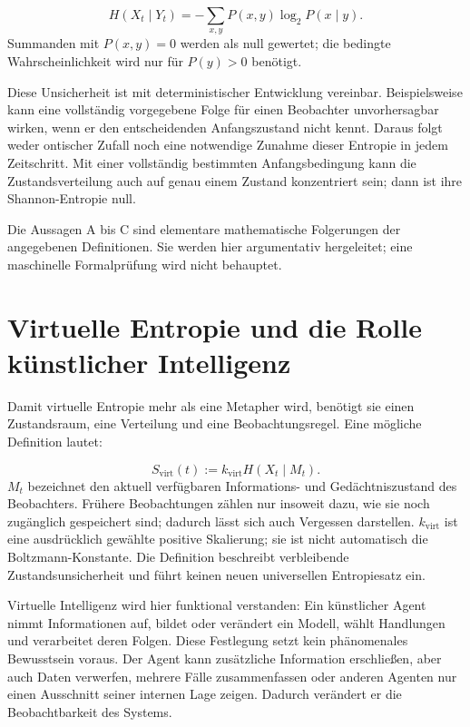 \begin{equation}\label{de:eq3}
H(X_t\mid Y_t)=-\sum_{x,y}P(x,y)\log_2 P(x\mid y).
\end{equation}
Summanden mit \(P(x,y)=0\) werden als null gewertet; die bedingte Wahrscheinlichkeit wird nur für \(P(y)>0\) benötigt.

Diese Unsicherheit ist mit deterministischer Entwicklung vereinbar. Beispielsweise kann eine vollständig vorgegebene Folge für einen Beobachter unvorhersagbar wirken, wenn er den entscheidenden Anfangszustand nicht kennt. Daraus folgt weder ontischer Zufall noch eine notwendige Zunahme dieser Entropie in jedem Zeitschritt. Mit einer vollständig bestimmten Anfangsbedingung kann die Zustandsverteilung auch auf genau einem Zustand konzentriert sein; dann ist ihre Shannon-Entropie null.

Die Aussagen A bis C sind elementare mathematische Folgerungen der angegebenen Definitionen. Sie werden hier argumentativ hergeleitet; eine maschinelle Formalprüfung wird nicht behauptet.

\section{Virtuelle Entropie und die Rolle künstlicher Intelligenz}\label{de:sec4}
Damit virtuelle Entropie mehr als eine Metapher wird, benötigt sie einen Zustandsraum, eine Verteilung und eine Beobachtungsregel. Eine mögliche Definition lautet:

\begin{equation}\label{de:eq4}
S_{\mathrm{virt}}(t):=k_{\mathrm{virt}}H(X_t\mid M_t).
\end{equation}
\(M_t\) bezeichnet den aktuell verfügbaren Informations- und Gedächtniszustand des Beobachters. Frühere Beobachtungen zählen nur insoweit dazu, wie sie noch zugänglich gespeichert sind; dadurch lässt sich auch Vergessen darstellen. \(k_{\mathrm{virt}}\) ist eine ausdrücklich gewählte positive Skalierung; sie ist nicht automatisch die Boltzmann-Konstante. Die Definition beschreibt verbleibende Zustandsunsicherheit und führt keinen neuen universellen Entropiesatz ein.

Virtuelle Intelligenz wird hier funktional verstanden: Ein künstlicher Agent nimmt Informationen auf, bildet oder verändert ein Modell, wählt Handlungen und verarbeitet deren Folgen. Diese Festlegung setzt kein phänomenales Bewusstsein voraus. Der Agent kann zusätzliche Information erschließen, aber auch Daten verwerfen, mehrere Fälle zusammenfassen oder anderen Agenten nur einen Ausschnitt seiner internen Lage zeigen. Dadurch verändert er die Beobachtbarkeit des Systems.

